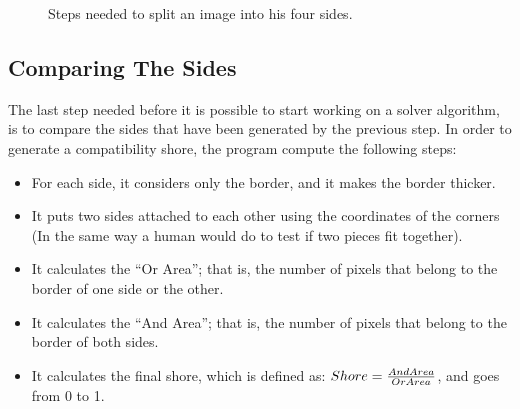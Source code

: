 \documentclass{article}
\begin{document}
\begin{figure}
  \caption{Steps needed to split an image into his four sides.}
  \label{fig:splitting_sides}
  
\end{figure}

\subsection{Comparing The Sides}\label{document:my_comparator}
The last step needed before it is possible to start working on
a solver algorithm, is to compare the sides that have been
generated by the previous step.\newline
In order to generate a compatibility shore,
the program compute the following steps:

\begin{itemize}
  \item For each side, it considers only the border, and it makes the border thicker.
  \item It puts two sides attached to each other using the coordinates of the corners (In the same way a human would do to test if two pieces fit together).
  \item It calculates the “Or Area”; that is, the number of pixels that belong to the border of one side or the other.
  \item It calculates the “And Area”; that is, the number of pixels that belong to the border of both sides.
  \item It calculates the final shore, which is defined as: \(Shore = \frac{And \space Area}{Or \space Area}\), and goes from 0 to 1.
\end{itemize}
\end{document}
